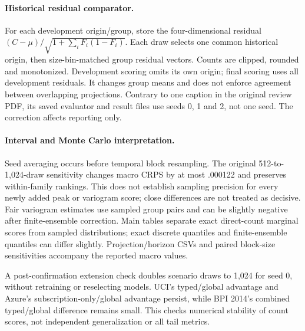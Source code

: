 \paragraph{Historical residual comparator.}
For each development origin/group, store the four-dimensional residual
$(C-\mu)/\sqrt{1+\sum_iF_i(1-F_i)}$. Each draw selects one common historical
origin, then size-bin-matched group residual vectors. Counts are clipped,
rounded and monotonized. Development scoring omits its own origin; final
scoring uses all development residuals. It changes group means and does not
enforce agreement between overlapping projections. Contrary to one caption
in the original review PDF, its saved evaluator and result files use seeds
0, 1 and 2, not one seed. The correction affects reporting only.

\paragraph{Interval and Monte Carlo interpretation.}
Seed averaging occurs before temporal block resampling. The original
512-to-1,024-draw sensitivity changes macro CRPS by at most .000122 and
preserves within-family rankings. This does not establish sampling precision
for every newly added peak or variogram score; close differences are not
treated as decisive. Fair variogram estimates use sampled group pairs and
can be slightly negative after finite-ensemble correction. Main tables
separate exact direct-count marginal scores from sampled distributions;
exact discrete quantiles and finite-ensemble quantiles can differ slightly.
Projection/horizon CSVs and paired block-size sensitivities accompany the
reported macro values.

A post-confirmation extension check doubles scenario draws to 1,024 for
seed 0, without retraining or reselecting models. UCI's typed/global advantage
and Azure's subscription-only/global advantage persist, while BPI 2014's
combined typed/global difference remains small. This checks numerical
stability of count scores, not independent generalization or all tail metrics.

